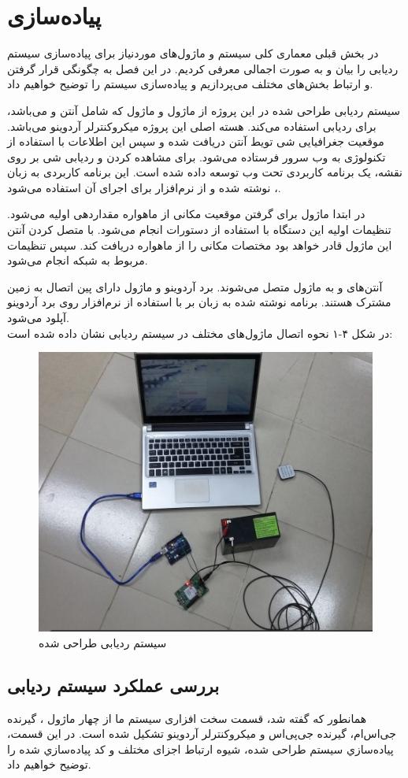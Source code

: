 \chapter{پیاده‌سازی}
در بخش قبلی معماری کلی سیستم و ماژول‌های موردنیاز برای پیاده‌سازی سیستم ردیابی را بیان و به صورت اجمالی معرفی کردیم. در این فصل به چگونگی قرار گرفتن و ارتباط بخش‌های مختلف می‌پردازیم و پیاده‌سازی سیستم را توضیح خواهیم داد.


سیستم ردیابی طراحی شده در این پروژه از ماژول  و ماژول  که شامل آنتن  و  می‌باشد، برای ردیابی استفاده می‌کند. هسته اصلی این پروژه میکروکنترلر آردوینو می‌باشد. موقعیت جغرافیایی شی تویط آنتن  دریافت شده و سپس این اطلاعات با استفاده از تکنولوژی  به وب سرور فرستاده می‌شود. برای مشاهده کردن و ردیابی شی بر روی نقشه، یک برنامه کاربردی تحت وب توسعه داده شده است. این برنامه کاربردی به زبان ،  نوشته شده و از نرم‌افزار  برای اجرای آن استفاده می‌شود.
 
 
در ابتدا ماژول  برای گرفتن موقعیت مکانی از ماهواره مقداردهی اولیه می‌شود. تنظیمات اولیه این دستگاه با استفاده از دستورات  انجام می‌شود. با متصل کردن آنتن  این ماژول قادر خواهد بود مختصات مکانی را از ماهواره دریافت کند. سپس تنظیمات مربوط به شبکه  انجام می‌شود.


آنتن‌های  و  به ماژول  متصل می‌شوند. برد آردوینو و ماژول  دارای پین اتصال به زمین مشترک هستند. برنامه نوشته شده به زبان  بر با استفاده از نرم‌افزار  روی برد آردوینو آپلود می‌شود.
\\
در شکل ۴-۱ نحوه اتصال ماژول‌های مختلف در سیستم ردیابی نشان داده شده است:
\begin{figure}[!h]
	\centerline{\includegraphics[width=.6\textwidth]{design-system}}
	\caption{سیستم ردیابی طراحی شده}
\end{figure}
\section{بررسی عملکرد سیستم ردیابی}
همانطور كه گفته شد، قسمت سخت‌ افزاری سیستم ما از چهار ماژول ، گیرنده جی‌اس‌ام، گیرنده جی‌پی‌اس و میکروکنترلر آردوینو تشکیل شده است. در اين قسمت، پياده‌سازي سيستم طراحی شده، شيوه ارتباط اجزای مختلف و كد پياده‌سازي شده را توضيح خواهیم داد.
